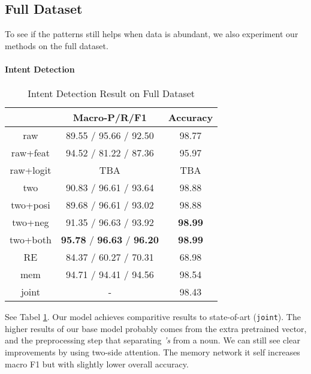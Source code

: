 \subsection{Full Dataset}
To see if the \RE patterns still helps when data is abundant, we also experiment our methods on the full dataset.

\paragraph{Intent Detection}

\begin{table}
\setlength{\tabcolsep}{0.23em}
\centering
\small{
\begin{tabular}{|c|c|c|}

\hline
  & Macro-P/R/F1 & Accuracy  \\
\hline
raw & 89.55 / 95.66 / 92.50 & 98.77  \\
\hline
raw+feat & 94.52 / 81.22 / 87.36 & 95.97  \\
\hline
raw+logit & TBA & TBA  \\
\hline
two & 90.83 / 96.61 / 93.64 & 98.88 \\
\hline
two+posi & 89.68 / 96.61 / 93.02 & 98.88 \\
\hline
two+neg & 91.35 / 96.63 / 93.92 & \textbf{98.99} \\
\hline
two+both & \textbf{95.78} / \textbf{96.63} / \textbf{96.20} & \textbf{98.99} \\
\hline
\hline
RE & 84.37 / 60.27 / 70.31 & 68.98 \\
\hline
mem & 94.71 / 94.41 / 94.56 & 98.54 \\
\hline
joint & - & 98.43 \\
\hline 

\end{tabular}
}
\caption{Intent Detection Result on Full Dataset}
\label{tab_intent_full}
\end{table}

See Tabel \ref{tab_intent_full}.
Our model achieves comparitive results to state-of-art (\texttt{joint}). The higher results of our base model probably comes from the extra pretrained vector, and the preprocessing step that separating \emph{'s} from a noun. We can still see clear improvements by using two-side attention. The memory network it self increases macro F1 but with slightly lower overall accuracy. 


